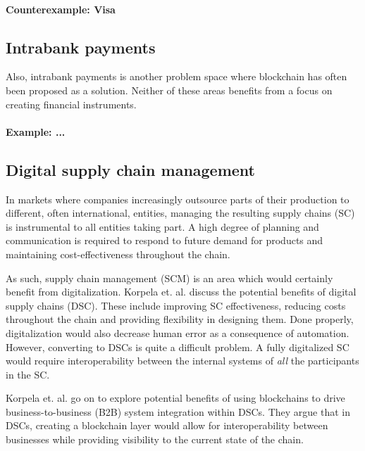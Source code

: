 \paragraph{Counterexample: Visa}

\subsection{Intrabank payments}

Also, intrabank payments is another problem space where
blockchain has often been proposed as a solution. Neither of these
areas benefits from a focus on creating financial instruments.


\paragraph{Example: ...}

\subsection{Digital supply chain management}

In markets where companies increasingly outsource parts of their
production to different, often international, entities, managing the
resulting supply chains (SC) is instrumental to all entities taking
part. A high degree of planning and communication is required to
respond to future demand for products and maintaining
cost-effectiveness throughout the chain.

As such, supply chain management (SCM) is an area which would
certainly benefit from digitalization. Korpela et. al.
\cite{korpelaDSC} discuss the potential benefits of digital supply
chains (DSC). These include improving SC effectiveness, reducing costs
throughout the chain and providing flexibility in designing them. Done
properly, digitalization would also decrease human error as a
consequence of automation. However, converting to DSCs is quite a
difficult problem. A fully digitalized SC would require
interoperability between the internal systems of \textit{all} the
participants in the SC.

Korpela et. al. go on to explore potential benefits of using
blockchains to drive business-to-business (B2B) system integration
within DSCs. They argue that in DSCs, creating a blockchain layer
would allow for interoperability between businesses while providing
visibility to the current state of the chain.

